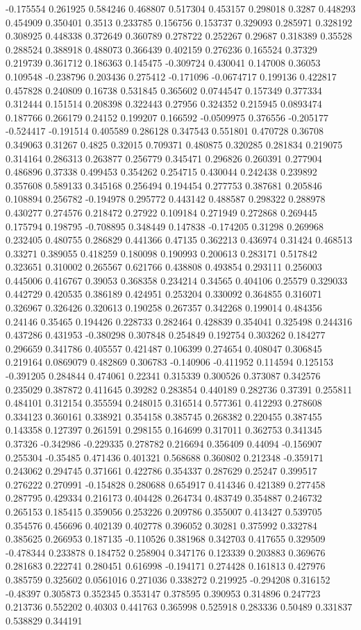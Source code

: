 -0.175554 0.261925 0.584246 0.468807 0.517304 0.453157 0.298018 0.3287 0.448293 0.454909 0.350401 0.3513 0.233785 0.156756 0.153737 0.329093 0.285971 0.328192 0.308925 0.448338 0.372649 0.360789 0.278722 0.252267 0.29687 0.318389 0.35528 0.288524 0.388918 0.488073 0.366439 0.402159 0.276236 0.165524 0.37329 0.219739 0.361712 0.186363 0.145475 -0.309724 0.430041 0.147008 0.36053 0.109548 -0.238796 0.203436 0.275412 -0.171096 -0.0674717 0.199136 0.422817 0.457828 0.240809 0.16738 0.531845 0.365602 0.0744547 0.157349 0.377334 0.312444 0.151514 0.208398 0.322443 0.27956 0.324352 0.215945 0.0893474 0.187766 0.266179 0.24152 0.199207 0.166592 -0.0509975 0.376556 -0.205177 -0.524417 -0.191514 0.405589 0.286128 0.347543 0.551801 0.470728 0.36708 0.349063 0.31267 0.4825 0.32015 0.709371 0.480875 0.320285 0.281834 0.219075 0.314164 0.286313 0.263877 0.256779 0.345471 0.296826 0.260391 0.277904 0.486896 0.37338 0.499453 0.354262 0.254715 0.430044 0.242438 0.239892 0.357608 0.589133 0.345168 0.256494 0.194454 0.277753 0.387681 0.205846 0.108894 0.256782 -0.194978 0.295772 0.443142 0.488587 0.298322 0.288978 0.430277 0.274576 0.218472 0.27922 0.109184 0.271949 0.272868 0.269445 0.175794 0.198795 -0.708895 0.348449 0.147838 -0.174205 0.31298 0.269968 0.232405 0.480755 0.286829 0.441366 0.47135 0.362213 0.436974 0.31424 0.468513 0.33271 0.389055 0.418259 0.180098 0.190993 0.200613 0.283171 0.517842 0.323651 0.310002 0.265567 0.621766 0.438808 0.493854 0.293111 0.256003 0.445006 0.416767 0.39053 0.368358 0.234214 0.34565 0.404106 0.25579 0.329033 0.442729 0.420535 0.386189 0.424951 0.253204 0.330092 0.364855 0.316071 0.326967 0.326426 0.320613 0.190258 0.267357 0.342268 0.199014 0.484356 0.24146 0.35465 0.194426 0.228733 0.282464 0.428839 0.354041 0.325498 0.244316 0.437286 0.431953 -0.380298 0.307848 0.254849 0.192754 0.303262 0.184277 0.296659 0.341786 0.405557 0.421487 0.106399 0.274654 0.408047 0.306845 0.219164 0.0869079 0.482869 0.306783 -0.140906 -0.411952 0.114594 0.125153 -0.391205 0.284844 0.474061 0.22341 0.315339 0.300526 0.373087 0.342576 0.235029 0.387872 0.411645 0.39282 0.283854 0.440189 0.282736 0.37391 0.255811 0.484101 0.312154 0.355594 0.248015 0.316514 0.577361 0.412293 0.278608 0.334123 0.360161 0.338921 0.354158 0.385745 0.268382 0.220455 0.387455 0.143358 0.127397 0.261591 0.298155 0.164699 0.317011 0.362753 0.341345 0.37326 -0.342986 -0.229335 0.278782 0.216694 0.356409 0.44094 -0.156907 0.255304 -0.35485 0.471436 0.401321 0.568688 0.360802 0.212348 -0.359171 0.243062 0.294745 0.371661 0.422786 0.354337 0.287629 0.25247 0.399517 0.276222 0.270991 -0.154828 0.280688 0.654917 0.414346 0.421389 0.277458 0.287795 0.429334 0.216173 0.404428 0.264734 0.483749 0.354887 0.246732 0.265153 0.185415 0.359056 0.253226 0.209786 0.355007 0.413427 0.539705 0.354576 0.456696 0.402139 0.402778 0.396052 0.30281 0.375992 0.332784 0.385625 0.266953 0.187135 -0.110526 0.381968 0.342703 0.417655 0.329509 -0.478344 0.233878 0.184752 0.258904 0.347176 0.123339 0.203883 0.369676 0.281683 0.222741 0.280451 0.616998 -0.194171 0.274428 0.161813 0.427976 0.385759 0.325602 0.0561016 0.271036 0.338272 0.219925 -0.294208 0.316152 -0.48397 0.305873 0.352345 0.353147 0.378595 0.390953 0.314896 0.247723 0.213736 0.552202 0.40303 0.441763 0.365998 0.525918 0.283336 0.50489 0.331837 0.538829 0.344191 